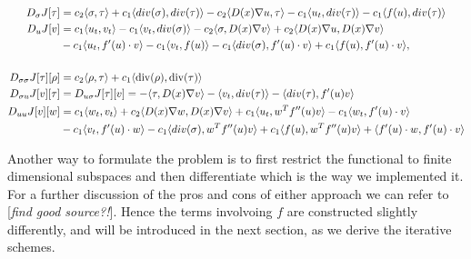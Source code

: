 \documentclass[../draft_1.tex]{subfiles}
\begin{document}
\begin{ceqn}
\begin{align}
D_{\sigma} J [\tau] &= c_2 \langle \sigma, \tau \rangle + c_1 \langle div(\sigma), div(\tau) \rangle - c_2 \langle D(x) \nabla u, \tau \rangle - c_1 \langle u_t, div(\tau) \rangle - c_1 \langle f(u), div(\tau) \rangle \\
D_{u} J [v] &=  c_1 \langle u_t, v_t \rangle - c_1 \langle v_t, div(\sigma) \rangle - c_2 \langle \sigma, D(x) \nabla v \rangle + c_2 \langle D(x) \nabla u, D(x) \nabla v \rangle  \\  
&- c_1 \langle u_t, f'(u) \cdot v \rangle  - c_1 \langle v_t, f(u) \rangle  - c_1 \langle div(\sigma), f'(u) \cdot v \rangle + c_1 \langle f(u), f'(u) \cdot v \rangle, \\
\\
\label{Q_ss}
D_{\sigma \sigma} J [\tau] [\rho] &= c_2 \langle \rho, \tau \rangle + c_1 \langle \mathop{}\!\mathrm{div}(\rho), \mathop{}\!\mathrm{div}(\tau) \rangle  \\
\label{Q_sigma_u}
D_{\sigma u}J  [v][\tau] &= D_{u \sigma}J  [\tau] [v] = - \langle \tau, D(x) \nabla v \rangle - \langle v_t, div(\tau) \rangle - \langle div(\tau), f'(u) v \rangle \\
\label{Q_uu}
D_{uu} J  [v][w] &= c_1 \langle w_t, v_t \rangle + c_2 \langle D(x) \nabla w, D(x) \nabla v \rangle + c_1 \langle u_t, w^T f''(u) v \rangle - c_1 \langle w_t, f'(u) \cdot v \rangle \\
&- c_1 \langle v_t, f'(u) \cdot w \rangle 
 - c_1 \langle div(\sigma), w^T f''(u) v \rangle + c_1 \langle f(u), w^T f''(u) v \rangle + \langle f'(u) \cdot w, f'(u) \cdot v \rangle 
\end{align}
\end{ceqn}

Another way to formulate the problem is to first restrict the functional to finite dimensional subspaces and then differentiate which is the way we implemented it. For a further discussion of the pros and cons of either approach we can refer to [\textit{find good source?!}]. Hence the terms involvoing $f$ are constructed slightly differently, and will be introduced in the next section, as we derive the iterative schemes. 
\end{document}
